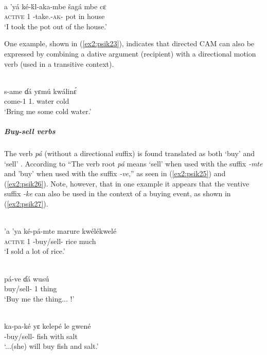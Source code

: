 \ea\label{ex2:psik22}
 \\
\gll a 'yá ké-ḱl-aka-mbe šagá mbe cɛ	\\
\textsc{active} 1 -take.-\textsc{ak}- pot in house	\\
\glt `I took the pot out of the house.'
\z 

One example, shown in (\ref{ex2:psik23}), indicates that directed CAM can also be expressed by combining a dative argument (recipient) with a directional motion verb (used in a transitive context).

\ea\label{ex2:psik23}
 \\
\gll  s-ame ɗá yɛmú kwálinɛ́	\\
come-1 1. water cold		\\
\glt `Bring me some cold water.'
\z 

\subparagraph{Buy-sell verbs}

The verb \textit{pá} (without a directional suffix) is found translated as both `buy' and `sell' \citep[60--61, 65, 80, 123]{smithKapsikiLanguage1969}. According to \citet[114]{smithKapsikiLanguage1969} ``The verb root \textit{pá} means `sell' when used with the suffix \textit{-mte} and 'buy' when used with the suffix \textit{-ve},'' as seen in (\ref{ex2:psik25}) and (\ref{ex2:psik26}). Note, however, that in one example it appears that the ventive suffix \textit{-ke} can also be used in the context of a buying event, as shown in (\ref{ex2:psik27}).

\ea\label{ex2:psik25}
 \\
\gll 'a 'ya ké-pá-mte marure kwélékwelé	\\
\textsc{active} 1 -buy/sell- rice much \\
\glt `I sold a lot of rice.'

\ex\label{ex2:psik26}
 \\
\gll  pá-ve ɗá wusú \\
buy/sell- 1 thing	\\
\glt `Buy me the thing... !'

\ex\label{ex2:psik27}
 \\
\gll  ka-pa-ké yɛ kelepé le gwené \\
-buy/sell-  fish with salt \\
\glt `...(she) will buy fish and salt.'
\z 

